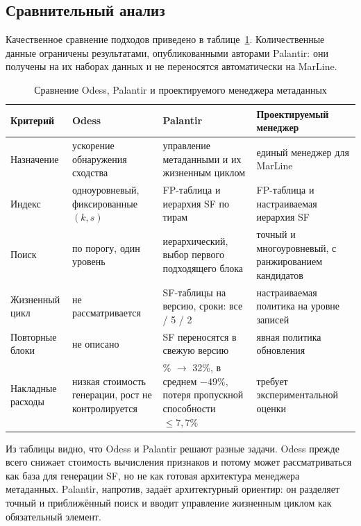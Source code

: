 \documentclass[a4paper]{article}
\begin{document}
\subsection{Сравнительный анализ}

Качественное сравнение подходов приведено в таблице~\ref{tab:comparison}.
Количественные данные ограничены результатами, опубликованными авторами
Palantir: они получены на их наборах данных и не переносятся автоматически
на MarLine.

\begin{table}[h]
\centering
\small
\begin{tabularx}{\textwidth}{@{}>{\raggedright\arraybackslash}p{}>{\raggedright\arraybackslash}X>{\raggedright\arraybackslash}X>{\raggedright\arraybackslash}X@{}}
\hline
Критерий & Odess & Palantir & Проектируемый менеджер \\
\hline
Назначение & ускорение обнаружения сходства & управление метаданными и их жизненным циклом & единый менеджер для MarLine \\
Индекс & одноуровневый, фиксированные $(k,s)$ & FP-таблица и иерархия SF по тирам & FP-таблица и настраиваемая иерархия SF \\
Поиск & по порогу, один уровень & иерархический, выбор первого подходящего блока & точный и многоуровневый, с ранжированием кандидатов \\
Жизненный цикл & не рассматривается & SF-таблицы на версию, сроки: все / 5 / 2 & настраиваемая политика на уровне записей \\
Повторные блоки & не описано & SF переносятся в свежую версию & явная политика обновления \\
Накладные расходы & низкая стоимость генерации, рост не контролируется & 133\% $\to$ 32\%, в среднем $-49\%$, потеря пропускной способности $\le 7{,}7\%$ & требует экспериментальной оценки \\
\hline
\end{tabularx}
\caption{Сравнение Odess, Palantir и проектируемого менеджера метаданных}
\label{tab:comparison}
\end{table}

Из таблицы видно, что Odess и Palantir решают разные задачи. Odess прежде всего
снижает стоимость вычисления признаков и потому может рассматриваться как база
для генерации SF, но не как готовая архитектура менеджера метаданных. Palantir,
напротив, задаёт архитектурный ориентир: он разделяет точный и приближённый
поиск и вводит управление жизненным циклом как обязательный элемент.
\end{document}
